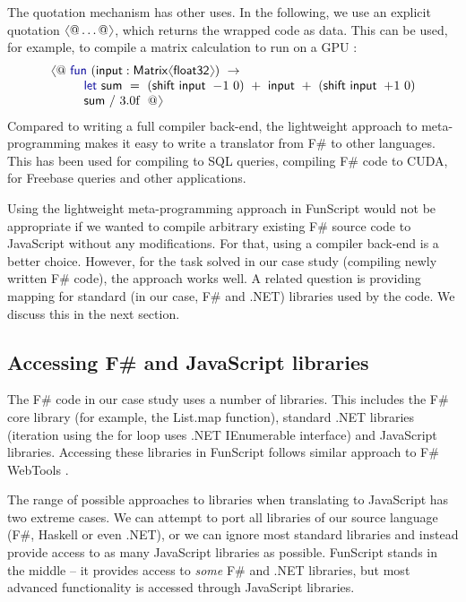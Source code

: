 \documentclass[submission,copyright,creativecommons]{eptcs}
\newcommand{\langl}{\begin{picture}(4.5,7)
\put(1.1,2.5){\rotatebox{60}{\line(1,0){5.5}}}
\put(1.1,2.5){\rotatebox{300}{\line(1,0){5.5}}}
\end{picture}}
\newcommand{\rangl}{\begin{picture}(4.5,7)
\put(.9,2.5){\rotatebox{120}{\line(1,0){5.5}}}
\put(.9,2.5){\rotatebox{240}{\line(1,0){5.5}}}
\end{picture}}
\newcommand{\kvd}[1]{\textnormal{\textcolor{kvdclr}{\sffamily #1}}}
\newcommand{\ident}[1]{\textnormal{\sffamily #1}}
\begin{document}
The quotation mechanism has other uses. In the following, we use an explicit quotation $\langl @ \ldots @\rangl$,
which returns the wrapped code as data. This can be used, for example, to compile a matrix calculation
to run on a GPU \cite{accelerator}:
%
\begin{equation*}
\begin{array}{l}
 \langl @~ \kvd{fun}~(\ident{input}:\ident{Matrix}\langl\ident{float32}\rangl)~\rightarrow \\
 \qquad~~ \kvd{let}~\ident{sum}~=~(\ident{shift input}~-\hspace{-0.2em}1~0) ~+~ \ident{input} ~+~ (\ident{shift input}~+\hspace{-0.2em}1~0) \\
 \qquad~~ \ident{sum}~/~3.0\textnormal{f}~~@\rangl
\end{array}
\end{equation*}
%
Compared to writing a full compiler back-end, the lightweight approach to meta-programming makes it easy to 
write a translator from F\# to other languages. This has been used for compiling to SQL queries, compiling
F\# code to CUDA, for Freebase queries \cite{fsharp-data} and other applications.

Using the lightweight meta-programming approach in FunScript would not be appropriate if we wanted to 
compile arbitrary existing F\# source code to JavaScript without any modifications. For that, using a 
compiler back-end is a better choice. However, for the task solved in our case study (compiling 
newly written F\# code), the approach works well. A related question is providing mapping for 
standard (in our case, F\# and .NET) libraries used by the code. We discuss this in the next section.

\subsection{Accessing F\# and JavaScript libraries}
\label{sec:js-lib}

The F\# code in our case study uses a number of libraries. This includes the F\# core library (for 
example, the \ident{List.map} function), standard .NET libraries (iteration using the \kvd{for} loop
uses .NET \ident{IEnumerable} interface) and JavaScript libraries. Accessing these libraries in 
FunScript follows similar approach to F\# WebTools \cite{fsharp-webtools}. 

The range of possible approaches to libraries when translating to JavaScript has two extreme cases.
We can attempt to port all libraries of our source language (F\#, Haskell or even .NET), or we 
can ignore most standard libraries and instead provide access to as many JavaScript libraries as 
possible. FunScript stands in the middle -- it provides access to \emph{some} F\# and .NET libraries,
but most advanced functionality is accessed through JavaScript libraries.
\end{document}
